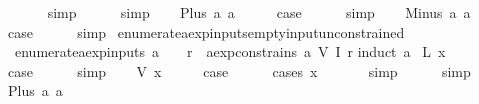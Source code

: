\begin{isabellebody}
\ \ \ \ \ \isamarkupfalse%
\ simp\isanewline
\ \ \ \ \isamarkupfalse%
\ simp\isanewline
{}\isamarkupfalse%
\isanewline
\ \ \isamarkupfalse%
\ {\isacharparenleft}Plus\ a{}\ a{}{\isacharparenright}\isanewline
\ \ \isamarkupfalse%
\ \isamarkupfalse%
\ {\isacharquery}case\isanewline
\ \ \ \ \isamarkupfalse%
\ simp\isanewline
{}\isamarkupfalse%
\isanewline
\ \ \isamarkupfalse%
\ {\isacharparenleft}Minus\ a{}\ a{}{\isacharparenright}\isanewline
\ \ \isamarkupfalse%
\ \isamarkupfalse%
\ {\isacharquery}case\isanewline
\ \ \ \ \isamarkupfalse%
\ simp\isanewline
{}\isamarkupfalse%
%
\endisatagproof
{\isafoldproof}%
%
\isadelimproof
\isanewline
%
\endisadelimproof
\isanewline
{}\isamarkupfalse%
\ enumerate{\isacharunderscore}aexp{\isacharunderscore}inputs{\isacharunderscore}empty{\isacharunderscore}input{\isacharunderscore}unconstrained{\isacharcolon}\isanewline
\ \ {\isachardoublequoteopen}enumerate{\isacharunderscore}aexp{\isacharunderscore}inputs\ a\ {\isacharequal}\ {\isacharbraceleft}{\isacharbraceright}\ {\isasymLongrightarrow}\ {\isasymforall}r{\isachardot}\ {\isasymnot}\ aexp{\isacharunderscore}constrains\ a\ {\isacharparenleft}V\ {\isacharparenleft}I\ r{\isacharparenright}{\isacharparenright}{\isachardoublequoteclose}\isanewline
%
\isadelimproof
%
\endisadelimproof
%
\isatagproof
{}\isamarkupfalse%
{\isacharparenleft}induct\ a{\isacharparenright}\isanewline
{}\isamarkupfalse%
\ {\isacharparenleft}L\ x{\isacharparenright}\isanewline
\ \ \isamarkupfalse%
\ \isamarkupfalse%
\ {\isacharquery}case\isanewline
\ \ \ \ \isamarkupfalse%
\ simp\isanewline
{}\isamarkupfalse%
\isanewline
\ \ \isamarkupfalse%
\ {\isacharparenleft}V\ x{\isacharparenright}\isanewline
\ \ \isamarkupfalse%
\ \isamarkupfalse%
\ {\isacharquery}case\isanewline
\ \ \ \ \isamarkupfalse%
\ {\isacharparenleft}cases\ x{\isacharparenright}\isanewline
\ \ \ \ \ \isamarkupfalse%
\ simp\isanewline
\ \ \ \ \isamarkupfalse%
\ simp\isanewline
{}\isamarkupfalse%
\isanewline
\ \ \isamarkupfalse%
\ {\isacharparenleft}Plus\ a{}\ a{}{\isacharparenright}\isanewline
\ \ \isamarkupfalse%

\end{isabellebody}
